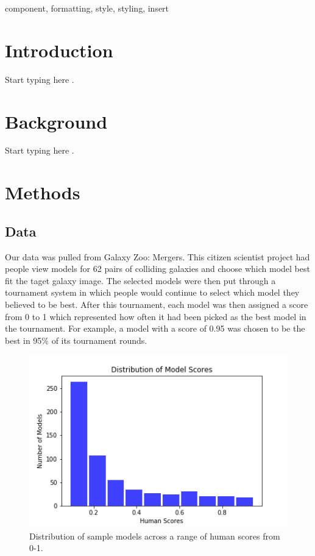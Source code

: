 \documentclass[conference]{IEEEtran}
\begin{document}
\begin{abstract}
This document is a model and instructions for \LaTeX.
This and the IEEEtran.cls file define the components of your paper [title, text, heads, etc.]. *CRITICAL: Do Not Use Symbols, Special Characters, Footnotes, 
or Math in Paper Title or Abstract.
\end{abstract}



\begin{IEEEkeywords}
component, formatting, style, styling, insert
\end{IEEEkeywords}

\section{Introduction}

Start typing here \cite{b1}.

\section{Background}

Start typing here \cite{b2}.

\section{Methods}

\subsection{Data}

Our data was pulled from Galaxy Zoo: Mergers. This citizen scientist project had people view models for 62 pairs of colliding galaxies and choose which model best fit the taget galaxy image. The selected models were then put through a tournament system in which people would continue to select which model they believed to be best. After this tournament, each model was then assigned a score from 0 to 1 which represented how often it had been picked as the best model in the tournament. For example, a model with a score of 0.95 was chosen to be the best in 95\% of its tournament rounds.

\begin{figure}[htbp]
\centerline{\includegraphics[width=0.75\linewidth]{./Images/distribution.png}}
\caption{Distribution of sample models across a range of human scores from 0-1.}
\label{fig:distribution}
\end{figure}
\end{document}
